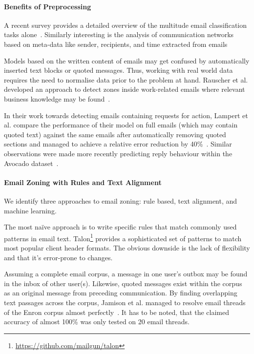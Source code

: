 \documentclass{llncs}
\begin{document}
\paragraph{Benefits of Preprocessing}
A recent survey provides a detailed overview of the multitude email classification tasks alone~\cite{classification}.
Similarly interesting is the analysis of communication networks based on meta-data like sender, recipients, and time extracted from emails~\cite{sna1,sna2}

Models based on the written content of emails may get confused by automatically inserted text blocks or quoted messages.
Thus, working with real world data requires the need to normalise data prior to the problem at hand.
Rauscher et al. developed an approach to detect zones inside work-related emails where relevant business knowledge may be found~\cite{rauscher2015context}.

In their work towards detecting emails containing requests for action, Lampert et al. compare the performance of their model on full emails (which may contain quoted text) against the same emails after automatically removing quoted sections and managed to achieve a relative error reduction by 40\%~\cite{rfa}.
Similar observations were made more recently predicting reply behaviour within the Avocado dataset~\cite{replying}.

\paragraph{Email Zoning with Rules and Text Alignment}
We identify three approaches to email zoning: rule based, text alignment, and machine learning.

The most na\"ive approach is to write specific rules that match commonly used patterns in email text.
Talon\footnote{\url{https://github.com/mailgun/talon}} provides a sophisticated set of patterns to match most popular client header formats.
The obvious downside is the lack of flexibility and that it's error-prone to changes.

Assuming a complete email corpus, a message in one user's outbox may be found in the inbox of other user(s).
Likewise, quoted messages exist within the corpus as an original message from preceding communication.
By finding overlapping text passages across the corpus, Jamison et al. managed to resolve email threads of the Enron corpus almost perfectly~\cite{headerless}.
It has to be noted, that the claimed accuracy of almost 100\% was only tested on 20 email threads.
\end{document}
